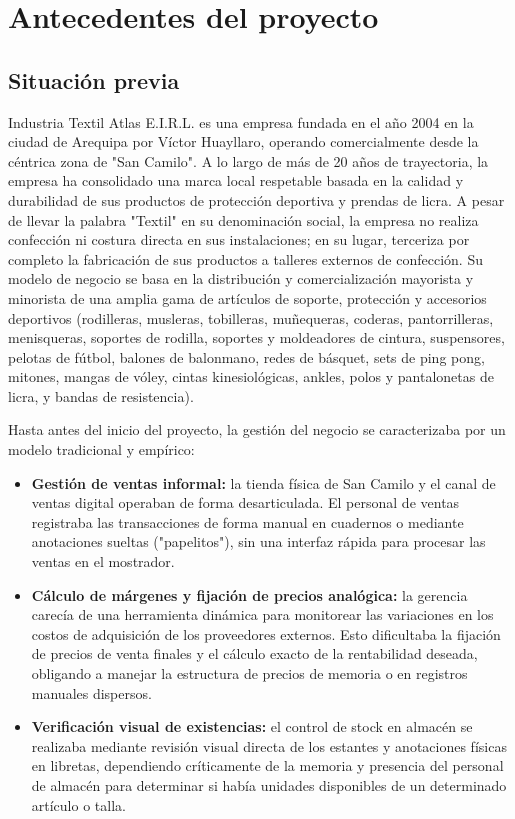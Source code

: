 \section{Antecedentes del proyecto}

\subsection{Situación previa}
\begin{indentedsubsection}
Industria Textil Atlas E.I.R.L. es una empresa fundada en el año 2004 en la ciudad de Arequipa por Víctor Huayllaro, operando comercialmente desde la céntrica zona de "San Camilo". A lo largo de más de 20 años de trayectoria, la empresa ha consolidado una marca local respetable basada en la calidad y durabilidad de sus productos de protección deportiva y prendas de licra. A pesar de llevar la palabra "Textil" en su denominación social, la empresa no realiza confección ni costura directa en sus instalaciones; en su lugar, terceriza por completo la fabricación de sus productos a talleres externos de confección. Su modelo de negocio se basa en la distribución y comercialización mayorista y minorista de una amplia gama de artículos de soporte, protección y accesorios deportivos (rodilleras, musleras, tobilleras, muñequeras, coderas, pantorrilleras, menisqueras, soportes de rodilla, soportes y moldeadores de cintura, suspensores, pelotas de fútbol, balones de balonmano, redes de básquet, sets de ping pong, mitones, mangas de vóley, cintas kinesiológicas, ankles, polos y pantalonetas de licra, y bandas de resistencia).

Hasta antes del inicio del proyecto, la gestión del negocio se caracterizaba por un modelo tradicional y empírico:

\begin{itemize}
    \item \textbf{Gestión de ventas informal:} la tienda física de San Camilo y el canal de ventas digital operaban de forma desarticulada. El personal de ventas registraba las transacciones de forma manual en cuadernos o mediante anotaciones sueltas ("papelitos"), sin una interfaz rápida para procesar las ventas en el mostrador.
    \item \textbf{Cálculo de márgenes y fijación de precios analógica:} la gerencia carecía de una herramienta dinámica para monitorear las variaciones en los costos de adquisición de los proveedores externos. Esto dificultaba la fijación de precios de venta finales y el cálculo exacto de la rentabilidad deseada, obligando a manejar la estructura de precios de memoria o en registros manuales dispersos.
    \item \textbf{Verificación visual de existencias:} el control de stock en almacén se realizaba mediante revisión visual directa de los estantes y anotaciones físicas en libretas, dependiendo críticamente de la memoria y presencia del personal de almacén para determinar si había unidades disponibles de un determinado artículo o talla.
\end{itemize}
\end{indentedsubsection}
 
